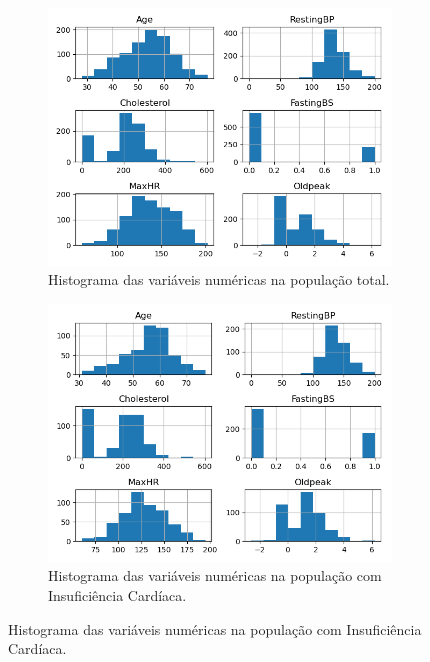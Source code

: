 \begin{figure}[H]
     \centering
     \begin{subfigure}[b]{0.3\textwidth}
         \ \caption{Histograma das variáveis numéricas na população total.}
 \label{fig:var:1:card}
 \centering
\includegraphics[scale=0.3]{images/hist_heart_t.png}
     \end{subfigure}
     \hfill
     \begin{subfigure}[b]{0.3\textwidth}
         \centering
         \caption{Histograma das variáveis numéricas na população com Insuficiência Cardíaca.}
 \label{fig:var:2:card}
 \centering
\includegraphics[scale=0.3]{images/hist_heart_yes.png}
     \end{subfigure}

\end{figure}
